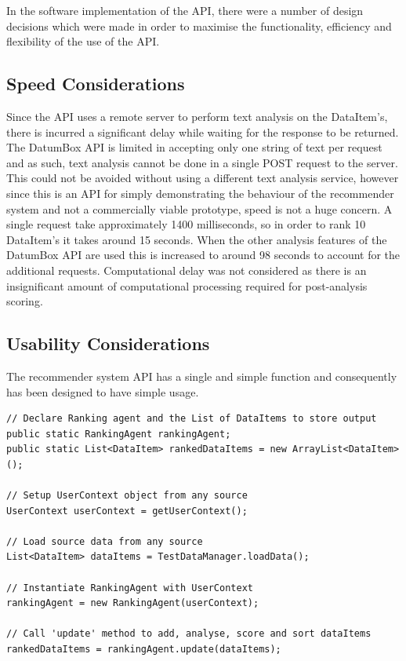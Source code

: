 In the software implementation of the API, there were a number of design decisions which were made in order to maximise the functionality, efficiency and flexibility of the use of the API. 

\subsection{Speed Considerations}

Since the API uses a remote server to perform text analysis on the DataItem's, there is incurred a significant delay while waiting for the response to be returned. The DatumBox API is limited in accepting only one string of text per request and as such, text analysis cannot be done in a single POST request to the server. This could not be avoided without using a different text analysis service, however since this is an API for simply demonstrating the behaviour of the recommender system and not a commercially viable prototype, speed is not a huge concern. 
A single request take approximately 1400 milliseconds, so in order to rank 10 DataItem's it takes around 15 seconds. When the other analysis features of the DatumBox API are used this is increased to around 98 seconds to account for the additional requests. 
Computational delay was not considered as there is an insignificant amount of computational processing required for post-analysis scoring. 

\subsection{Usability Considerations}

The recommender system API has a single and simple function and consequently has been designed to have simple usage. 

\lstset{language=Java, caption=API usage example, label=APIUsageExample}
\begin{lstlisting}
// Declare Ranking agent and the List of DataItems to store output
public static RankingAgent rankingAgent;
public static List<DataItem> rankedDataItems = new ArrayList<DataItem>();

// Setup UserContext object from any source
UserContext userContext = getUserContext();

// Load source data from any source
List<DataItem> dataItems = TestDataManager.loadData();

// Instantiate RankingAgent with UserContext
rankingAgent = new RankingAgent(userContext); 

// Call 'update' method to add, analyse, score and sort dataItems
rankedDataItems = rankingAgent.update(dataItems);
\end{lstlisting}

